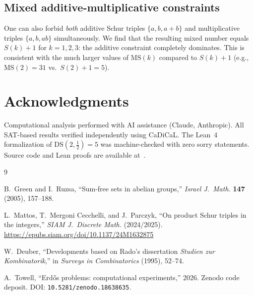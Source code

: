 \documentclass[11pt]{article}
\theoremstyle{plain}
\theoremstyle{definition}
\newcommand{\DS}{\mathrm{DS}}
\newcommand{\MS}{\mathrm{MS}}
\begin{document}
\subsection{Mixed additive-multiplicative constraints}

One can also forbid \emph{both} additive Schur triples
$\{a,b,a{+}b\}$ and multiplicative triples $\{a,b,ab\}$
simultaneously.
We find that the resulting mixed number equals $S(k)+1$ for
$k=1,2,3$: the additive constraint completely dominates.
This is consistent with the much larger values of $\MS(k)$ compared
to $S(k)+1$ (e.g., $\MS(2)=31$ vs.\ $S(2)+1=5$).

\section*{Acknowledgments}

Computational analysis performed with AI assistance (Claude,
Anthropic).
All SAT-based results verified independently using CaDiCaL.
The Lean~4 formalization of $\DS(2,\tfrac{1}{2})=5$ was
machine-checked with zero sorry statements.
Source code and Lean proofs are available at~\cite{code-repo}.

\begin{thebibliography}{9}

B.~Green and I.~Ruzsa,
``Sum-free sets in abelian groups,''
\emph{Israel J.\ Math.} \textbf{147} (2005), 157--188.

L.~Mattos, T.~Mergoni Cecchelli, and J.~Parczyk,
``On product Schur triples in the integers,''
\emph{SIAM J.\ Discrete Math.} (2024/2025).
\url{https://epubs.siam.org/doi/10.1137/24M1632875}

W.~Deuber, ``Developments based on Rado's dissertation
\emph{Studien zur Kombinatorik},''
in \emph{Surveys in Combinatorics} (1995), 52--74.

A.~Towell,
``Erd\H{o}s problems: computational experiments,''
2026.
Zenodo code deposit.
DOI: \texttt{10.5281/zenodo.18638635}.

\end{thebibliography}
\end{document}
